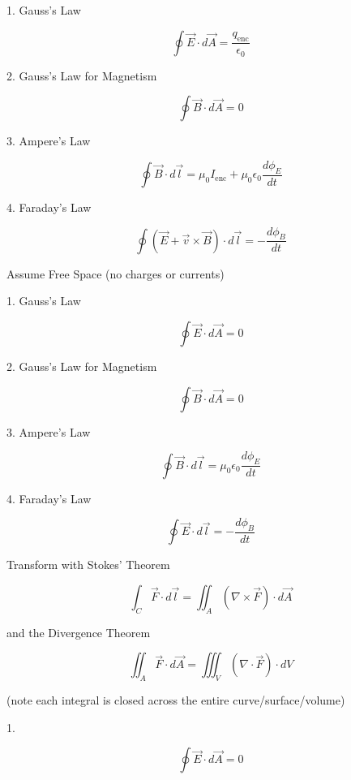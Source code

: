 
% 



1. Gauss's Law

\[
\oint \vec{E} \cdot d\vec{A} = \frac{q_{\text{enc}}}{\epsilon_0}
\]

2. Gauss's Law for Magnetism

\[
\oint \vec{B} \cdot d\vec{A} = 0
\]

3. Ampere's Law

\[
\oint \vec{B} \cdot d\vec{l} = \mu_0 I_{\text{enc}} + \mu_0 \epsilon_0 \frac{d \phi_E}{dt}
\]

4. Faraday's Law

\[
\oint (\vec{E} + \vec{v} \times \vec{B}) \cdot d\vec{l} = -\frac{d \phi_B}{dt}
\]

\vspace{1em}

Assume Free Space (no charges or currents)

\vspace{1em}

1. Gauss's Law

\[
\oint \vec{E} \cdot d\vec{A} = 0
\]

2. Gauss's Law for Magnetism

\[
\oint \vec{B} \cdot d\vec{A} = 0
\]

3. Ampere's Law

\[
\oint \vec{B} \cdot d\vec{l} = \mu_0 \epsilon_0 \frac{d \phi_E}{dt}
\]

4. Faraday's Law

\[
\oint \vec{E} \cdot d\vec{l} = -\frac{d \phi_B}{dt}
\]

\vspace{1em}

Transform with Stokes' Theorem

\[
\int_C \vec{F} \cdot d\vec{l} = \iint_A (\nabla \times \vec{F}) \cdot d\vec{A}
\]

and the Divergence Theorem

\[
\iint_A \vec{F} \cdot d\vec{A} = \iiint_V (\nabla \cdot \vec{F}) \cdot dV
\]

(note each integral is closed across the entire curve/surface/volume)

\vspace{1em}

1. 

\[
\oint \vec{E} \cdot d\vec{A} = 0
\]

